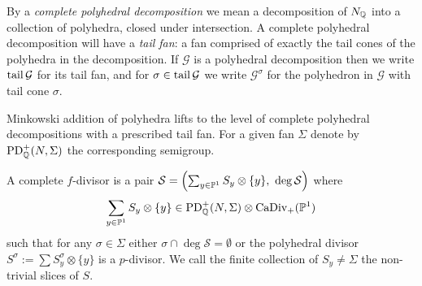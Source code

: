 By a \textit{complete polyhedral decomposition} we mean a decomposition of \(N_{\mathbb{Q}}\) into a collection of polyhedra, closed under intersection. A complete polyhedral decomposition will have a \textit{tail fan}: a fan comprised of exactly the tail cones of the polyhedra in the decomposition. If \(\mathcal{G}\) is a polyhedral decomposition then we write \(\operatorname{tail} \mathcal{G}\) for its tail fan, and for \(\sigma \in \operatorname{tail} \mathcal{G}\) we write  \(\mathcal{G}^\sigma\) for the polyhedron in \(\mathcal{G}\) with tail cone \(\sigma\).

Minkowski addition of polyhedra lifts to the level of complete polyhedral decompositions with a prescribed tail fan. For a given fan \(\Sigma\) denote by \(\operatorname{PD}^+_{\mathbb{Q}}(N,\Sigma)\) the corresponding semigroup.

\begin{definition}
A complete \(f\)-divisor is a pair \(\mathcal{S} = \left( \sum_{y \in \mathbb{P}^1} S_y \otimes \{y\}, \ \deg \mathcal{S} \right)\) where
\[
\sum_{y \in \mathbb{P}^1} S_y \otimes \{y\} \in \operatorname{PD}^+_{\mathbb{Q}}(N,\Sigma) \otimes \operatorname{CaDiv}_+(\mathbb{P}^1)
\] such that for any \(\sigma \in \Sigma\) either \(\sigma \cap \deg \mathcal{S} = \emptyset \) or the polyhedral divisor \(S^\sigma := \sum S_y^\sigma \otimes \{y\}\) is a \(p\)-divisor. We call the finite collection of \(S_y \neq \Sigma\) the non-trivial slices of \(S\).
\end{definition}
